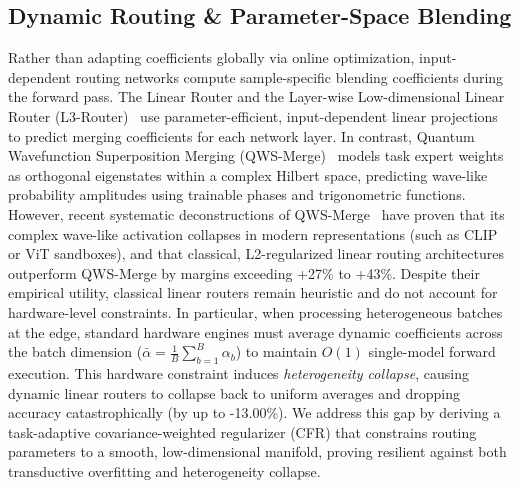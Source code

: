 \subsection{Dynamic Routing \& Parameter-Space Blending}
Rather than adapting coefficients globally via online optimization, input-dependent routing networks compute sample-specific blending coefficients during the forward pass. 
The Linear Router and the Layer-wise Low-dimensional Linear Router (L3-Router)~\cite{l3router} use parameter-efficient, input-dependent linear projections to predict merging coefficients for each network layer. 
In contrast, Quantum Wavefunction Superposition Merging (QWS-Merge)~\cite{qwsmerge} models task expert weights as orthogonal eigenstates within a complex Hilbert space, predicting wave-like probability amplitudes using trainable phases and trigonometric functions. 
However, recent systematic deconstructions of QWS-Merge~\cite{pendelton2026deconstructing} have proven that its complex wave-like activation collapses in modern representations (such as CLIP or ViT sandboxes), and that classical, L2-regularized linear routing architectures outperform QWS-Merge by margins exceeding +27\% to +43\%. 
Despite their empirical utility, classical linear routers remain heuristic and do not account for hardware-level constraints. 
In particular, when processing heterogeneous batches at the edge, standard hardware engines must average dynamic coefficients across the batch dimension ($\bar{\alpha} = \frac{1}{B} \sum_{b=1}^B \alpha_b$) to maintain $O(1)$ single-model forward execution. 
This hardware constraint induces \emph{heterogeneity collapse}, causing dynamic linear routers to collapse back to uniform averages and dropping accuracy catastrophically (by up to -13.00\%). 
We address this gap by deriving a task-adaptive covariance-weighted regularizer (CFR) that constrains routing parameters to a smooth, low-dimensional manifold, proving resilient against both transductive overfitting and heterogeneity collapse.
